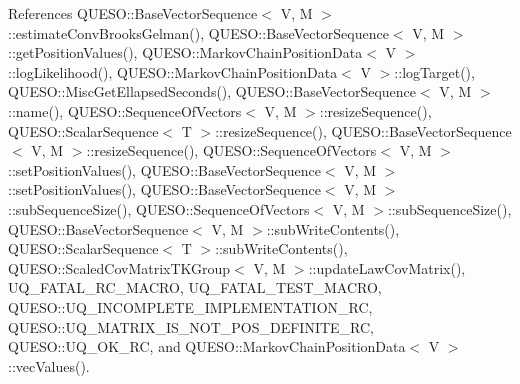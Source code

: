 References Q\-U\-E\-S\-O\-::\-Base\-Vector\-Sequence$<$ V, M $>$\-::estimate\-Conv\-Brooks\-Gelman(), Q\-U\-E\-S\-O\-::\-Base\-Vector\-Sequence$<$ V, M $>$\-::get\-Position\-Values(), Q\-U\-E\-S\-O\-::\-Markov\-Chain\-Position\-Data$<$ V $>$\-::log\-Likelihood(), Q\-U\-E\-S\-O\-::\-Markov\-Chain\-Position\-Data$<$ V $>$\-::log\-Target(), Q\-U\-E\-S\-O\-::\-Misc\-Get\-Ellapsed\-Seconds(), Q\-U\-E\-S\-O\-::\-Base\-Vector\-Sequence$<$ V, M $>$\-::name(), Q\-U\-E\-S\-O\-::\-Sequence\-Of\-Vectors$<$ V, M $>$\-::resize\-Sequence(), Q\-U\-E\-S\-O\-::\-Scalar\-Sequence$<$ T $>$\-::resize\-Sequence(), Q\-U\-E\-S\-O\-::\-Base\-Vector\-Sequence$<$ V, M $>$\-::resize\-Sequence(), Q\-U\-E\-S\-O\-::\-Sequence\-Of\-Vectors$<$ V, M $>$\-::set\-Position\-Values(), Q\-U\-E\-S\-O\-::\-Base\-Vector\-Sequence$<$ V, M $>$\-::set\-Position\-Values(), Q\-U\-E\-S\-O\-::\-Base\-Vector\-Sequence$<$ V, M $>$\-::sub\-Sequence\-Size(), Q\-U\-E\-S\-O\-::\-Sequence\-Of\-Vectors$<$ V, M $>$\-::sub\-Sequence\-Size(), Q\-U\-E\-S\-O\-::\-Base\-Vector\-Sequence$<$ V, M $>$\-::sub\-Write\-Contents(), Q\-U\-E\-S\-O\-::\-Scalar\-Sequence$<$ T $>$\-::sub\-Write\-Contents(), Q\-U\-E\-S\-O\-::\-Scaled\-Cov\-Matrix\-T\-K\-Group$<$ V, M $>$\-::update\-Law\-Cov\-Matrix(), U\-Q\-\_\-\-F\-A\-T\-A\-L\-\_\-\-R\-C\-\_\-\-M\-A\-C\-R\-O, U\-Q\-\_\-\-F\-A\-T\-A\-L\-\_\-\-T\-E\-S\-T\-\_\-\-M\-A\-C\-R\-O, Q\-U\-E\-S\-O\-::\-U\-Q\-\_\-\-I\-N\-C\-O\-M\-P\-L\-E\-T\-E\-\_\-\-I\-M\-P\-L\-E\-M\-E\-N\-T\-A\-T\-I\-O\-N\-\_\-\-R\-C, Q\-U\-E\-S\-O\-::\-U\-Q\-\_\-\-M\-A\-T\-R\-I\-X\-\_\-\-I\-S\-\_\-\-N\-O\-T\-\_\-\-P\-O\-S\-\_\-\-D\-E\-F\-I\-N\-I\-T\-E\-\_\-\-R\-C, Q\-U\-E\-S\-O\-::\-U\-Q\-\_\-\-O\-K\-\_\-\-R\-C, and Q\-U\-E\-S\-O\-::\-Markov\-Chain\-Position\-Data$<$ V $>$\-::vec\-Values().


